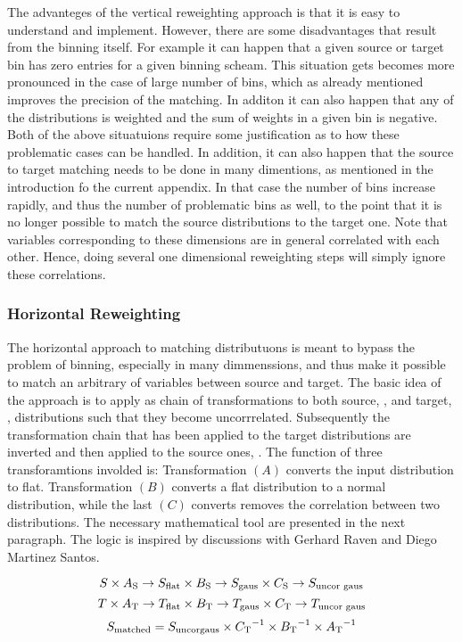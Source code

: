 The advanteges of the vertical reweighting approach is that it is easy to understand and implement.
However, there are some disadvantages that result from the binning itself. For example it can happen
that a given source or target bin has zero entries for a given binning scheam. This situation gets
becomes more pronounced in the case of large number of bins, which as already mentioned improves the
precision of the matching. In additon it can also happen that any of the distributions is weighted and
the sum of weights in a given bin is negative. Both of the above situatuions require some justification
as to how these problematic cases can be handled. In addition, it can also happen that the source to
target matching needs to be done in many dimentions, as mentioned in the introduction fo the current
appendix. In that case the number of bins increase rapidly, and thus the number of problematic bins as well,
to the point that it is no longer possible to match the source distributions to the target one.
Note that variables corresponding to these dimensions are in general correlated with each other.
Hence, doing several one dimensional reweighting steps will simply ignore these correlations.

\subsubsection{Horizontal Reweighting}
The horizontal approach to matching distributuons is meant to bypass the problem of binning, especially
in many dimmenssions, and thus make it possible to match an arbitrary of variables between source and target.
The basic idea of the approach is to apply as chain of transformations to both source, ,
and target, , distributions such that they become uncorrrelated. Subsequently the
transformation chain that has been applied to the target distributions are inverted and then applied to the
source ones, . The function of three transforamtions involded is:
Transformation $(A)$ converts the input distribution to flat. Transformation $(B)$ converts a flat distribution
to a normal distribution, while the last $(C)$ converts removes the correlation between two distributions.
The necessary mathematical tool are presented in the next paragraph. The logic is inspired by discussions
with Gerhard Raven and Diego Martinez Santos.

\begin{equation}
  \label{source_trans}
  S \times A_{\text{S}} \rightarrow S_{\rm flat} \times B_{\text{S}} \rightarrow S_{\rm gaus} \times C_{\text{S}} \rightarrow S_\text{\rm uncor gaus}
\end{equation}
\begin{equation}
  \label{target_trans}
  T \times A_{\text{T}} \rightarrow T_{\rm flat} \times B_{\text{T}} \rightarrow T_{\rm gaus} \times C_{\text{T}} \rightarrow T_\text{\rm uncor gaus}
\end{equation}
\begin{equation}
  \label{match_distributions}
  S_{\rm matched} = S_{\rm uncor gaus} \times {C_{\text{T}}}^{-1} \times {B_{\text{T}}}^{-1} \times {A_{\text{T}}}^{-1}
\end{equation}


